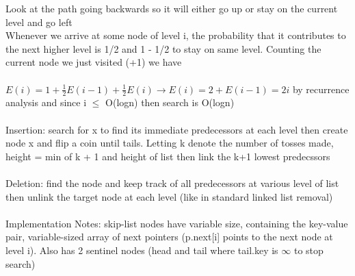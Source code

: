 \documentclass{article}
\begin{document}
  Look at the path going backwards so it will either go up or stay on the current level and go left \\
  Whenever we arrive at some node of level i, the probability that it contributes to the next higher level is 1/2 and 1 - 1/2 to stay on same level. Counting the current node we just visited (+1) we have\\ \\
  $E(i) = 1 + \frac{1}{2}E(i-1) + \frac{1}{2}E(i) \rightarrow E(i) = 2 + E(i-1) = 2i$ by recurrence analysis and since i $\leq$ O(logn) then search is O(logn)\\ \\
  Insertion: search for x to find its immediate predecessors at each level then create node x and flip a coin until tails. Letting k denote the number of tosses made, height = min of k + 1 and height of list then link the k+1 lowest predecssors \\ \\
  Deletion: find the node and keep track of all predecessors at various level of list then unlink the target node at each level (like in standard linked list removal) \\ \\
  Implementation Notes: skip-list nodes have variable size, containing the key-value pair, variable-sized array of next pointers (p.next[i] points to the next node at level i). Also has 2 sentinel nodes (head and tail where tail.key is $\infty$ to stop search)\\
  \newpage
\end{document}
